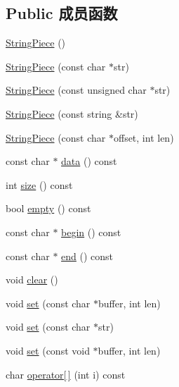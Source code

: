 \subsection*{Public 成员函数}
\begin{DoxyCompactItemize}
\item 
\hyperlink{classmuduo_1_1StringPiece_a4c296db5c55ee41bd29ab2d1af87f3dd}{String\+Piece} ()
\item 
\hyperlink{classmuduo_1_1StringPiece_ad5ac9c67dc87039531a4d958350add7b}{String\+Piece} (const char $\ast$str)
\item 
\hyperlink{classmuduo_1_1StringPiece_ae62926b7fc38fa0ea85a3a6554b21f61}{String\+Piece} (const unsigned char $\ast$str)
\item 
\hyperlink{classmuduo_1_1StringPiece_a7ed4b9eef78ac4a2a760ff93502d807d}{String\+Piece} (const string \&str)
\item 
\hyperlink{classmuduo_1_1StringPiece_a49a39734f89dcd6a9e6d5b6698704013}{String\+Piece} (const char $\ast$offset, int len)
\item 
const char $\ast$ \hyperlink{classmuduo_1_1StringPiece_a39a256207a84f316547e36c755373d03}{data} () const
\item 
int \hyperlink{classmuduo_1_1StringPiece_af9593d4a5ff4274efaf429cb4f9e57cc}{size} () const
\item 
bool \hyperlink{classmuduo_1_1StringPiece_a644718bb2fb240de962dc3c9a1fdf0dc}{empty} () const
\item 
const char $\ast$ \hyperlink{classmuduo_1_1StringPiece_a5386e98f71cb440232f0c41041f50af4}{begin} () const
\item 
const char $\ast$ \hyperlink{classmuduo_1_1StringPiece_a8f7e2912f169cf1aa7eeaec74b5fd151}{end} () const
\item 
void \hyperlink{classmuduo_1_1StringPiece_ac8bb3912a3ce86b15842e79d0b421204}{clear} ()
\item 
void \hyperlink{classmuduo_1_1StringPiece_a1f0ee9dccfd3553dffa874b3bc701fb3}{set} (const char $\ast$buffer, int len)
\item 
void \hyperlink{classmuduo_1_1StringPiece_a2d1485d6ad21670a4092ad4ddb532daa}{set} (const char $\ast$str)
\item 
void \hyperlink{classmuduo_1_1StringPiece_a77360c2ea2a40be8ac0e1c1db34b9f2a}{set} (const void $\ast$buffer, int len)
\item 
char \hyperlink{classmuduo_1_1StringPiece_a142e70c83cd0bd7a84011867711b4cb5}{operator\mbox{[}$\,$\mbox{]}} (int i) const
\item 

\end{DoxyCompactItemize}
